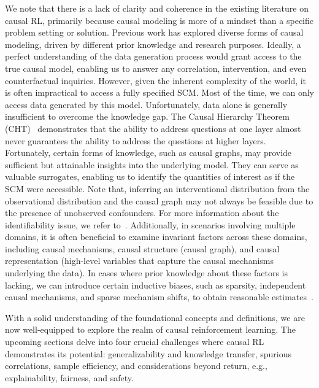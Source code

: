 \documentclass[10pt]{article} %
\theoremstyle{definition}
\begin{document}
We note that there is a lack of clarity and coherence in the existing literature on causal RL, primarily because causal modeling is more of a mindset than a specific problem setting or solution. 
Previous work has explored diverse forms of causal modeling, driven by different prior knowledge and research purposes. 
Ideally, a perfect understanding of the data generation process would grant access to the true causal model, enabling us to answer any correlation, intervention, and even counterfactual inquiries. 
However, given the inherent complexity of the world, it is often impractical to access a fully specified SCM. 
Most of the time, we can only access data generated by this model. Unfortunately, data alone is generally insufficient to overcome the knowledge gap. 
The Causal Hierarchy Theorem (CHT)~\citep{bareinboimPearlHierarchyFoundations2022} demonstrates that the ability to address questions at one layer almost never guarantees the ability to address the questions at higher layers. 
Fortunately, certain forms of knowledge, such as causal graphs, may provide sufficient but attainable insights into the underlying model. They can serve as valuable surrogates, enabling us to identify the quantities of interest as if the SCM were accessible.
Note that, inferring an interventional distribution from the observational distribution and the causal graph may not always be feasible due to the presence of unobserved confounders. 
For more information about the identifiability issue, we refer to~\citet{bareinboimPearlHierarchyFoundations2022}.
Additionally, in scenarios involving multiple domains, it is often beneficial to examine invariant factors across these domains, including causal mechanisms, causal structure (causal graph), and causal representation (high-level variables that capture the causal mechanisms underlying the data). 
In cases where prior knowledge about these factors is lacking, we can introduce certain inductive biases, such as sparsity, independent causal mechanisms, and sparse mechanism shifts, to obtain reasonable estimates~\cite{scholkopfCausalRepresentationLearning2021a,sontakkeCausalCuriosityRL2021a,huangAdaRLWhatWhere2022a,huangActionSufficientStateRepresentation2022a}.

With a solid understanding of the foundational concepts and definitions, we are now well-equipped to explore the realm of causal reinforcement learning. The upcoming sections delve into four crucial challenges where causal RL demonstrates its potential: generalizability and knowledge transfer, spurious correlations, sample efficiency, and considerations beyond return, e.g., explainability, fairness, and safety. 
\end{document}
